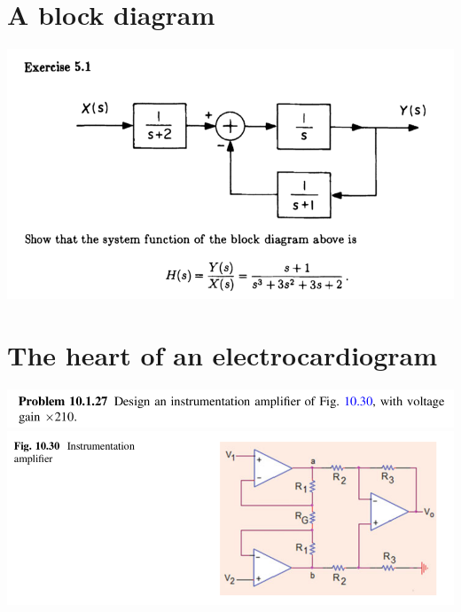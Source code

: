 \documentclass[11pt]{book}
\begin{document}
\newpage

\section{A block diagram}
\begin{center}
	\includegraphics[width=\textwidth]{figures/q3.25.png}
\end{center}

\newpage

\section{The heart of an electrocardiogram}
\begin{center}
	\includegraphics[width=\textwidth]{figures/q3.27.png} \\
	\includegraphics[width=\textwidth]{figures/q3.28.png}
\end{center}

\newpage
\end{document}
